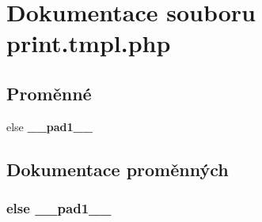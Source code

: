\section{Dokumentace souboru print.tmpl.php}
\label{print_8tmpl_8php}
\subsection*{Proměnné}
\begin{CompactItemize}
\item 
else {\bf \_\-\_\-pad1\_\-\_\-}
\end{CompactItemize}


\subsection{Dokumentace proměnných}
\subsubsection{\setlength{\rightskip}{0pt plus 5cm}else {\bf \_\-\_\-pad1\_\-\_\-}}\label{print_8tmpl_8php_e8b4bb1441c6ab4dcb28a37bc46c8ead}


